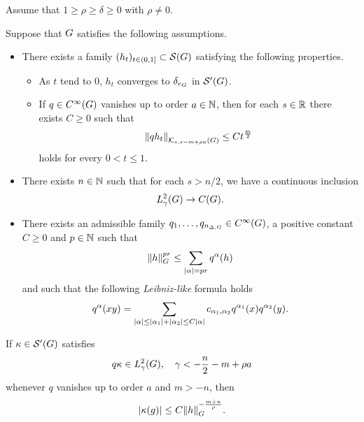 \begin{theorem}
    Assume that $1 \geq \rho \geq \delta \geq 0$ with $\rho \neq 0$.

    Suppose that $\Group$ satisfies the following assumptions.
    \begin{itemize}
        \item
            There exists a family $(h_t)_{t \in (0, 1]} \subset \Schwartz \Group$
            satisfying the following properties.
            \begin{itemize}
                \item As $t$ tend to $0$, $h_t$ converges to $\delta_{e_\Group}$ in $\TemperedDistributions \Group$.
                \item If $q \in \SmoothFunctions {\Group}$ vanishes up to order $a \in \N$,
                    then for each $s \in \R$ there exists $C \geq 0$ such that
                    \begin{align}
                        \norm [\KernelsSobolev s {s - m + \rho a}] {q h_t}
                        \leq C t^{\frac m 2}
                        \label{eq:kernel_estimates:heat_kernel_condition}
                    \end{align}
                    holds for every $0 < t \leq 1$.
            \end{itemize}
        \item There exists $n \in \N$ such that for each $s > n/2$,
            we have a continuous inclusion
            \begin{align*}
                \Sobolev \gamma \to \ContinuousFunctions \Group.
            \end{align*}
        \item There exists an admissible family $q_1, \dots, q_{\dimDifferenceOperators} \in \SmoothFunctions \Group$, a positive constant $C \geq 0$ and $p \in \N$ such that
            \begin{align*}
                \norm [\Group] h^{p r} \leq \sum_{\abs \alpha = pr} q^\alpha(h)
            \end{align*}
            and such that the following \emph{Leibniz-like} formula holds
            \begin{align*}
                q^\alpha(x y) = \sum_{\abs \alpha \leq \abs {\alpha_1} + \abs {\alpha_2} \leq C \abs \alpha}
                c_{\alpha_1, \alpha_2} q^{\alpha_1}(x) q^{\alpha_2}(y).
            \end{align*}
    \end{itemize}

    If $\kappa \in \TemperedDistributions \Group$ satisfies
    \begin{align}
        q \kappa \in \Sobolev \gamma,
        \quad \gamma < -\frac n 2 -m + \rho a
        \label{eq:kernel_estimates:assumption_on_the_kernel}
    \end{align}
    whenever $q$ vanishes up to order $a$ and $m > -n$,
    then
    \begin{align*}
        \abs{\kappa(g)} \leq C \norm [\Group] h^{-\frac{m + n} \rho}.
    \end{align*}
\end{theorem}
